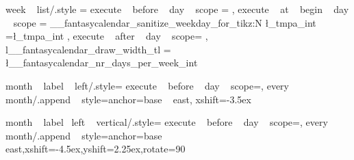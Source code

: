 \tikzset
  {
    week ~ list/.style = 
      {
        execute ~ before ~ day ~ scope =
          {
              {
                  { }
                  { 
                    \pgftransformyshift{-\pgf@y}
                  } 
              } { }
          }
        ,
        execute ~ at ~ begin ~ day ~ scope =
          {
            \pgfmathsetlength{}%
            \__fantasycalendar_sanitize_weekday_for_tikz:N \l_tmpa_int
            \pgf@x=\l_tmpa_int\pgf@x%
            \pgftransformxshift{\pgf@x}%
          }
        ,
        execute ~ after ~ day ~ scope=
          {
              {
                \pgftransformyshift{-\pgf@y}
              }{ }%
          }
        ,
        l__fantasycalendar_draw_width_tl = \l__fantasycalendar_nr_days_per_week_int
      }    
  }
    
    
    


%
%



\tikzset
  {
    month ~ label ~ left/.style=
      {
        execute ~ before ~ day ~ scope={},
        every ~ month/.append ~ style={anchor=base ~ east, xshift=-3.5ex}
      }
  }

\tikzset
  {
    month ~ label ~left ~ vertical/.style=
      {
        execute ~ before ~ day ~ scope={},
        every ~ month/.append ~ style={anchor=base ~ east,xshift=-4.5ex,yshift=2.25ex,rotate=90}
    }
  }

